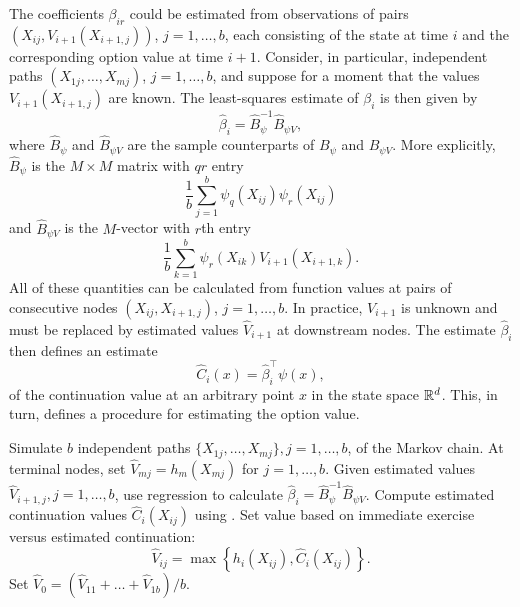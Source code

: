 The coefficients $\beta_{ir}$ could be estimated from observations of pairs $(X_{ij}, V_{i+1}(X_{i+1,j}))$, $j = 1, \dots, b$, each consisting of the state at time $i$ and the corresponding option value at time $i+1$. Consider, in particular, independent paths $(X_{1j}, \dots, X_{mj})$, $j = 1, \dots, b$, and suppose for a moment that the values $V_{i+1}(X_{i+1,j})$ are known. The least-squares estimate of $\beta_i$ is then given by
\begin{equation*}
	\hat{\beta}_i = \hat{B}_\psi^{-1} \hat{B}_{\psi V},
\end{equation*}
where $\hat{B}_\psi$ and $\hat{B}_{\psi V}$ are the sample counterparts of $B_\psi$ and $B_{\psi V}$. More explicitly, $\hat{B}_\psi$ is the $M \times M$ matrix with $qr$ entry
\begin{equation*}
	\frac{1}{b} \sum_{j=1}^b \psi_q(X_{ij}) \psi_r(X_{ij})
\end{equation*}
and $\hat{B}_{\psi V}$ is the $M$-vector with $r$th entry
\begin{equation} \label{eq:SampleCounterpartVector}
	\frac{1}{b} \sum_{k=1}^b \psi_r(X_{ik}) V_{i+1}(X_{i+1, k}).
\end{equation}
All of these quantities can be calculated from function values at pairs of consecutive nodes $(X_{ij}, X_{i+1, j})$, $j = 1, \dots, b$. In practice, $V_{i+1}$ is unknown and must be replaced by estimated values $\hat{V}_{i+1}$ at downstream nodes. The estimate $\hat{\beta}_i$ then defines an estimate
\begin{equation} \label{eq:EstimatedContinuationValue}
	\hat{C}_i(x) = \hat{\beta}_i^\top \psi(x),
\end{equation}
of the continuation value at an arbitrary point $x$ in the state space $\mathbb{R}^d$. This, in turn, defines a procedure for estimating the option value.

\begin{algorithm}[H]
	\caption{Regression-Based Pricing Algorithm}
	\label{alg:GeneralRegressionPricing}
	\begin{algorithmic}[1]
		\State Simulate $b$ independent paths $\{X_{1j}, \dots, X_{mj}\}, j = 1, \dots, b$, of the Markov chain.
		\State At terminal nodes, set $\hat{V}_{mj} = h_m(X_{mj})$ for $j = 1, \dots, b$.
		\State Given estimated values $\hat{V}_{i+1, j}, j = 1, \dots, b$, use regression to calculate $\hat{\beta}_i = \hat{B}_\psi^{-1} \hat{B}_{\psi V}$.
		\State Compute estimated continuation values $\hat{C}_i(X_{ij})$ using .
		\State Set value based on immediate exercise versus estimated continuation:
		\begin{equation} \label{eq:GeneralRegressionUpdate}
			\hat{V}_{ij} = \max \left\{ h_i(X_{ij}), \hat{C}_i(X_{ij}) \right\}.
		\end{equation}
		\EndFor
		\EndFor
		\State Set $\hat{V}_0 = (\hat{V}_{11} + \dots + \hat{V}_{1b}) / b$.
	\end{algorithmic}
\end{algorithm}

